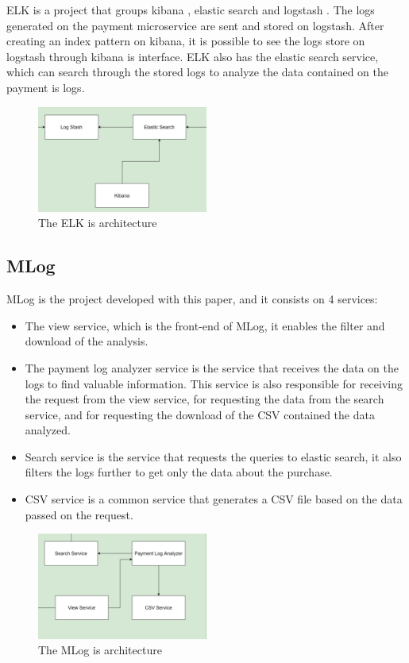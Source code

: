 ELK \cite{elk} is a project that groups kibana \cite{kibana}, elastic search \cite{elasticsearch} and logstash \cite{logstash}. The logs generated on the payment microservice are sent and stored on logstash. After creating an index pattern on kibana, it is possible to see the logs store on logstash through kibana is interface. ELK also has the elastic search service, which can search through the stored logs to analyze the data contained on the payment is logs.

\begin{figure}[htbp]
\centering
\centerline{\includegraphics[width=0.5\textwidth]{Media/elk.png}}
\caption{The ELK is architecture}
\label{fig:architecture-elk}
\end{figure}

\subsection{MLog}

MLog \cite{mlog} is the project developed with this paper, and it consists on 4 services:

\begin{itemize}
  \item The view service, which is the front-end of MLog, it enables the filter and download of the analysis.
  \item The payment log analyzer service is the service that receives the data on the logs to find valuable information. This service is also responsible for receiving the request from the view service, for requesting the data from the search service, and for requesting the download of the CSV contained the data analyzed.
  \item Search service is the service that requests the queries to elastic search, it also filters the logs further to get only the data about the purchase.
  \item CSV service is a common service that generates a CSV file based on the data passed on the request.
\end{itemize}

\begin{figure}[htbp]
\centering
\centerline{\includegraphics[width=0.5\textwidth]{Media/mlog.png}}
\caption{The MLog is architecture}
\label{fig:architecture-mlog}
\end{figure}